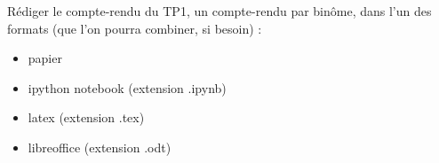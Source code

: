 \documentclass{exam}
\begin{document}
\begin{questions}
\question
Rédiger le compte-rendu du TP1, un compte-rendu par binôme, dans l'un des formats (que l'on pourra combiner, si besoin) :
\begin{itemize}
\item
papier
\item
ipython notebook (extension .ipynb)
\item
latex (extension .tex)
\item
libreoffice (extension .odt)
\end{itemize}

\end{questions}
\end{document}
